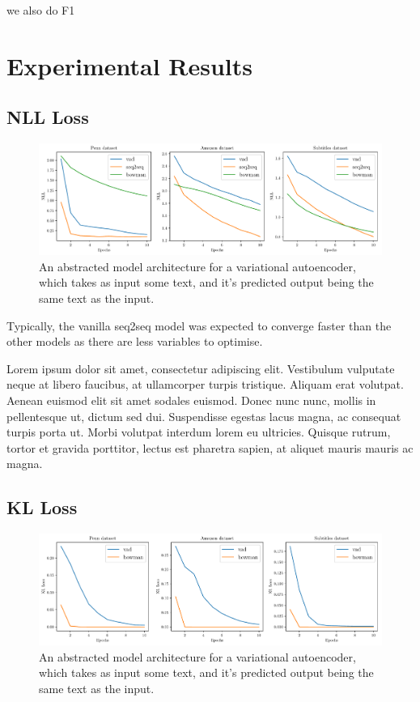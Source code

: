\documentclass[12pt,twoside]{report}
\begin{document}
we also do F1


\chapter{Experimental Results}


\section{NLL Loss}

\begin{figure}[!ht]
	\centering
	\includegraphics[width=150mm]{results/nll.pdf}
	\caption{An abstracted model architecture for a variational autoencoder, which takes as input some text, and it's predicted output being the same text as the input.\label{r:nll}}
  \end{figure}

Typically, the vanilla seq2seq model was expected to converge faster than the other models as there are less variables to optimise. 

Lorem ipsum dolor sit amet, consectetur adipiscing elit. Vestibulum vulputate neque at libero faucibus, at ullamcorper turpis tristique. Aliquam erat volutpat. Aenean euismod elit sit amet sodales euismod. Donec nunc nunc, mollis in pellentesque ut, dictum sed dui. Suspendisse egestas lacus magna, ac consequat turpis porta ut. Morbi volutpat interdum lorem eu ultricies. Quisque rutrum, tortor et gravida porttitor, lectus est pharetra sapien, at aliquet mauris mauris ac magna. 

\section{KL Loss}

\begin{figure}[!ht]
	\centering
	\includegraphics[width=150mm]{results/kl_loss.pdf}
	\caption{An abstracted model architecture for a variational autoencoder, which takes as input some text, and it's predicted output being the same text as the input.\label{r:kl_loss}}
	\end{figure}
	
\end{document}
